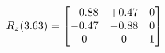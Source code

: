 \documentclass[preview]{standalone}
\begin{document}
\begin{align*}
\special{dvisvgm:raw <g id='unique000'>}R_{z}(3.63) = \begin{bmatrix}-0.88 & +0.47 & 0 \\-0.47 & -0.88 & 0 \\0 & 0 & 1\end{bmatrix}\special{dvisvgm:raw </g>}
\end{align*}
\end{document}
